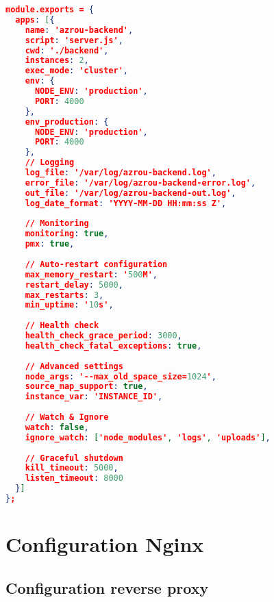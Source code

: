 \begin{lstlisting}[language=json, caption=ecosystem.config.js - Configuration PM2]
module.exports = {
  apps: [{
    name: 'azrou-backend',
    script: 'server.js',
    cwd: './backend',
    instances: 2,
    exec_mode: 'cluster',
    env: {
      NODE_ENV: 'production',
      PORT: 4000
    },
    env_production: {
      NODE_ENV: 'production',
      PORT: 4000
    },
    // Logging
    log_file: '/var/log/azrou-backend.log',
    error_file: '/var/log/azrou-backend-error.log',
    out_file: '/var/log/azrou-backend-out.log',
    log_date_format: 'YYYY-MM-DD HH:mm:ss Z',
    
    // Monitoring
    monitoring: true,
    pmx: true,
    
    // Auto-restart configuration
    max_memory_restart: '500M',
    restart_delay: 5000,
    max_restarts: 3,
    min_uptime: '10s',
    
    // Health check
    health_check_grace_period: 3000,
    health_check_fatal_exceptions: true,
    
    // Advanced settings
    node_args: '--max_old_space_size=1024',
    source_map_support: true,
    instance_var: 'INSTANCE_ID',
    
    // Watch & Ignore
    watch: false,
    ignore_watch: ['node_modules', 'logs', 'uploads'],
    
    // Graceful shutdown
    kill_timeout: 5000,
    listen_timeout: 8000
  }]
};
\end{lstlisting}

\section{Configuration Nginx}

\subsection{Configuration reverse proxy}


